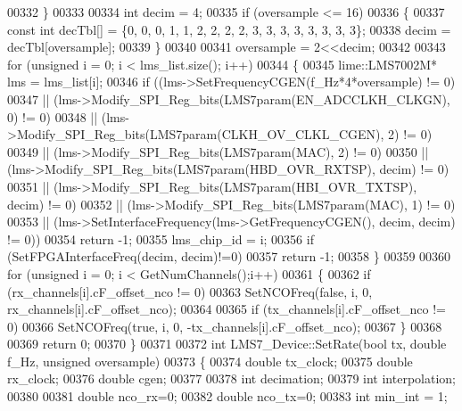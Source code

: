 \begin{DoxyCode}
00332     \}
00333 
00334     \textcolor{keywordtype}{int} decim = 4;
00335     \textcolor{keywordflow}{if} (oversample <= 16)
00336     \{
00337         \textcolor{keyword}{const} \textcolor{keywordtype}{int} decTbl[] = \{0, 0, 0, 1, 1, 2, 2, 2, 2, 3, 3, 3, 3, 3, 3, 3, 3\};
00338         decim = decTbl[oversample];
00339     \}
00340 
00341     oversample = 2<<decim;
00342 
00343     \textcolor{keywordflow}{for} (\textcolor{keywordtype}{unsigned} i = 0; i < lms_list.size(); i++)
00344     \{
00345          lime::LMS7002M* lms = lms_list[i];
00346         \textcolor{keywordflow}{if} ((lms->SetFrequencyCGEN(f\_Hz*4*oversample) != 0)
00347             || (lms->Modify_SPI_Reg_bits(LMS7param(EN_ADCCLKH_CLKGN), 0) != 0)
00348             || (lms->Modify_SPI_Reg_bits(LMS7param(CLKH_OV_CLKL_CGEN), 2) != 0)
00349             || (lms->Modify_SPI_Reg_bits(LMS7param(MAC), 2) != 0)
00350             || (lms->Modify_SPI_Reg_bits(LMS7param(HBD_OVR_RXTSP), decim) != 0)
00351             || (lms->Modify_SPI_Reg_bits(LMS7param(HBI_OVR_TXTSP), decim) != 0)
00352             || (lms->Modify_SPI_Reg_bits(LMS7param(MAC), 1) != 0)
00353             || (lms->SetInterfaceFrequency(lms->GetFrequencyCGEN(), decim, decim) != 0))
00354             \textcolor{keywordflow}{return} -1;
00355          lms_chip_id = i;
00356          \textcolor{keywordflow}{if} (SetFPGAInterfaceFreq(decim, decim)!=0)
00357              \textcolor{keywordflow}{return} -1;
00358     \}
00359 
00360     \textcolor{keywordflow}{for} (\textcolor{keywordtype}{unsigned} i = 0; i < GetNumChannels();i++)
00361     \{
00362         \textcolor{keywordflow}{if} (rx_channels[i].cF\_offset\_nco != 0)
00363            SetNCOFreq(\textcolor{keyword}{false}, i, 0, rx_channels[i].cF\_offset\_nco);
00364 
00365         \textcolor{keywordflow}{if} (tx_channels[i].cF\_offset\_nco != 0)
00366            SetNCOFreq(\textcolor{keyword}{true}, i, 0, -tx_channels[i].cF\_offset\_nco);
00367     \}
00368 
00369     \textcolor{keywordflow}{return} 0;
00370 \}
00371 
00372 \textcolor{keywordtype}{int} LMS7_Device::SetRate(\textcolor{keywordtype}{bool} tx, \textcolor{keywordtype}{double} f\_Hz, \textcolor{keywordtype}{unsigned} oversample)
00373 \{
00374     \textcolor{keywordtype}{double} tx\_clock;
00375     \textcolor{keywordtype}{double} rx\_clock;
00376     \textcolor{keywordtype}{double} cgen;
00377 
00378     \textcolor{keywordtype}{int} decimation;
00379     \textcolor{keywordtype}{int} interpolation;
00380 
00381     \textcolor{keywordtype}{double} nco\_rx=0;
00382     \textcolor{keywordtype}{double} nco\_tx=0;
00383     \textcolor{keywordtype}{int} min\_int = 1;

\end{DoxyCode}
